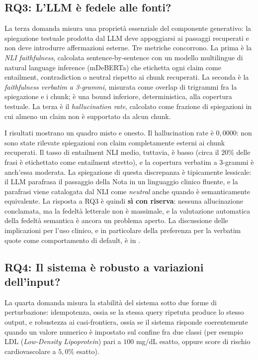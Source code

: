 \subsection{RQ3: L'LLM è fedele alle fonti?}
\label{sec:rq3}

La terza domanda misura una proprietà essenziale del componente generativo: la spiegazione testuale prodotta dal LLM deve appoggiarsi ai passaggi recuperati e non deve introdurre affermazioni esterne. Tre metriche concorrono. La prima è la \emph{NLI faithfulness}, calcolata sentence-by-sentence con un modello multilingue di natural language inference (mDeBERTa) che etichetta ogni claim come entailment, contradiction o neutral rispetto ai chunk recuperati. La seconda è la \emph{faithfulness verbatim a 3-grammi}, misurata come overlap di trigrammi fra la spiegazione e i chunk; è una bound inferiore, deterministica, alla copertura testuale. La terza è il \emph{hallucination rate}, calcolato come frazione di spiegazioni in cui almeno un claim non è supportato da alcun chunk.

I risultati mostrano un quadro misto e onesto. Il hallucination rate è $0{,}0000$: non sono state rilevate spiegazioni con claim completamente esterni ai chunk recuperati. Il tasso di entailment NLI medio, tuttavia, è basso (circa il $20\%$ delle frasi è etichettato come entailment stretto), e la copertura verbatim a 3-grammi è anch'essa moderata. La spiegazione di questa discrepanza è tipicamente lessicale: il LLM parafrasa il passaggio della Nota in un linguaggio clinico fluente, e la parafrasi viene catalogata dal NLI come \emph{neutral} anche quando è semanticamente equivalente. La risposta a RQ3 è quindi \textbf{sì con riserva}: nessuna allucinazione conclamata, ma la fedeltà letterale non è massimale, e la valutazione automatica della fedeltà semantica è ancora un problema aperto. La discussione delle implicazioni per l'uso clinico, e in particolare della preferenza per la verbatim quote come comportamento di default, è in .

\subsection{RQ4: Il sistema è robusto a variazioni dell'input?}
\label{sec:rq4}

La quarta domanda misura la stabilità del sistema sotto due forme di perturbazione: idempotenza, ossia se la stessa query ripetuta produce lo stesso output, e robustezza ai casi-frontiera, ossia se il sistema risponde coerentemente quando un valore numerico è impostato sul confine fra due classi (per esempio LDL (\emph{Low-Density Lipoprotein}) pari a $100$ mg/dL esatto, oppure score di rischio cardiovascolare a $5{,}0\%$ esatto).

